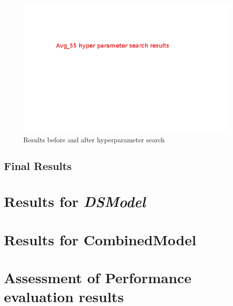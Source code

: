 \begin{figure}
\centering
\includegraphics[scale=0.6]{figures/SSModelRegPar.png}
\caption{Results before and after hyperparameter search}\label{fig:SSModelRegPar}
\end{figure}



\subsection{Final Results}\label{subsec:SSFinalRes}

\section{Results for \textit{DSModel}}

\section{Results for CombinedModel}

\section{Assessment of Performance evaluation results}

